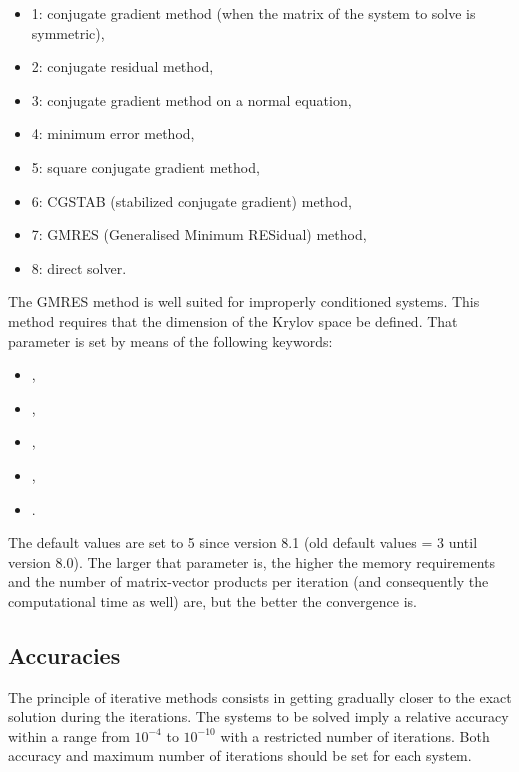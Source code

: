 \begin{itemize}
\item 1: conjugate gradient method (when the matrix of the system to solve
is symmetric),

\item 2: conjugate residual method,

\item 3: conjugate gradient method on a normal equation,

\item 4: minimum error method,

\item 5: square conjugate gradient method,

\item 6: CGSTAB (stabilized conjugate gradient) method,

\item 7: GMRES (Generalised Minimum RESidual) method,

\item 8: direct solver.
\end{itemize}

The GMRES method is well suited for improperly conditioned systems. This method
requires that the dimension of the Krylov space be defined. That parameter is
set by means of the following keywords:

\begin{itemize}
\item {},

\item {},

\item {},

\item {},

\item {}.
\end{itemize}

The default values are set to 5 since version 8.1 (old default values
= 3 until version 8.0). The larger that parameter is, the higher the
memory requirements and the number of matrix-vector products per iteration (and
consequently the computational time as well) are, but the better the
convergence is.

\subsection{Accuracies}
\label{sec:accuracy}
The principle of iterative methods consists in getting gradually closer to the
exact solution during the iterations. The systems to be solved imply a relative
accuracy within a range from $10^{-4}$ to $10^{-10}$ with a restricted
number of iterations. Both accuracy and maximum number of iterations should be
set for each system.

